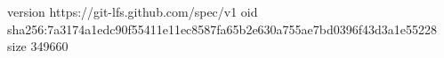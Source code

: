 version https://git-lfs.github.com/spec/v1
oid sha256:7a3174a1edc90f55411e11ec8587fa65b2e630a755ae7bd0396f43d3a1e55228
size 349660
